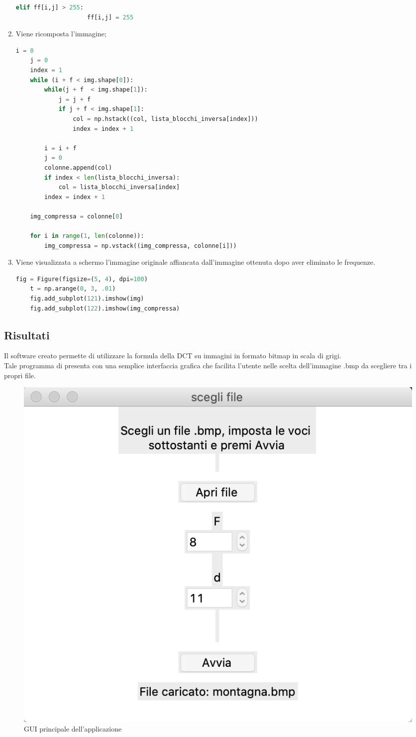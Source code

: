 \documentclass[preprint,12pt]{elsarticle}
\begin{document}
\begin{enumerate}
\begin{lstlisting}[language=Python]
                elif ff[i,j] > 255:
                    ff[i,j] = 255
\end{lstlisting}
\newpage
\item Viene ricomposta l'immagine;
\begin{lstlisting}[language=Python]
    i = 0
    j = 0
    index = 1
    while (i + f < img.shape[0]):
        while(j + f  < img.shape[1]):
            j = j + f
            if j + f < img.shape[1]:
                col = np.hstack((col, lista_blocchi_inversa[index]))
                index = index + 1

        i = i + f
        j = 0
        colonne.append(col)
        if index < len(lista_blocchi_inversa):
            col = lista_blocchi_inversa[index]
        index = index + 1

    img_compressa = colonne[0]

    for i in range(1, len(colonne)):
        img_compressa = np.vstack((img_compressa, colonne[i]))
\end{lstlisting}

\item Viene visualizzata a schermo l'immagine originale affiancata dall'immagine ottenuta dopo aver eliminato le frequenze.
\begin{lstlisting}[language=Python]    
    fig = Figure(figsize=(5, 4), dpi=100)
    t = np.arange(0, 3, .01)
    fig.add_subplot(121).imshow(img)
    fig.add_subplot(122).imshow(img_compressa)
\end{lstlisting}

\end{enumerate}

\newpage

\subsection*{Risultati}
Il software creato permette di utilizzare la formula della DCT su immagini in formato bitmap in scala di grigi.\\
Tale programma di presenta con una semplice interfaccia grafica che facilita l'utente nelle scelta dell'immagine .bmp da scegliere tra i propri file.

\begin{figure}[H]
	\centering
	\includegraphics[width=0.5\linewidth]{gui}
	\caption{GUI principale dell'applicazione}
\end{figure}
\end{document}
